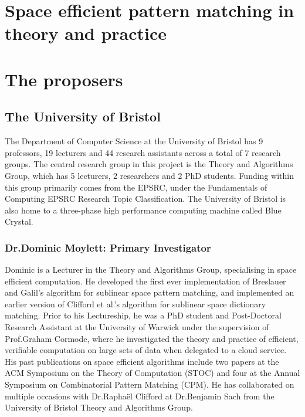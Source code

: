 \documentclass[a4paper,11pt]{article}
\begin{document}
    \section*{Space efficient pattern matching in theory and practice}

    \section*{The proposers}

    \subsection*{The University of Bristol}

    The Department of Computer Science at the University of Bristol has 9 professors, 19 lecturers and 44 research assistants across a total of 7 research groups. The central research group in this project is the Theory and Algorithms Group, which has 5 lecturers, 2 researchers and 2 PhD students. Funding within this group primarily comes from the EPSRC, under the Fundamentals of Computing EPSRC Research Topic Classification. The University of Bristol is also home to a three-phase high performance computing machine called Blue Crystal.

    \subsubsection*{Dr.\@ Dominic Moylett: Primary Investigator}

    Dominic is a Lecturer in the Theory and Algorithms Group, specialising in space efficient computation. He developed the first ever implementation of Breslauer and Galil's algorithm for sublinear space pattern matching, and implemented an earlier version of Clifford et al.'s algorithm for sublinear space dictionary matching. Prior to his Lectureship, he was a PhD student and Post-Doctoral Research Assistant at the University of Warwick under the supervision of Prof.\@ Graham Cormode, where he investigated the theory and practice of efficient, verifiable computation on large sets of data when delegated to a cloud service. His past publications on space efficient algorithms include two papers at the ACM Symposium on the Theory of Computation (STOC) and four at the Annual Symposium on Combinatorial Pattern Matching (CPM). He has collaborated on multiple occasions with Dr.\@ Rapha\"{e}l Clifford at Dr.\@ Benjamin Sach from the University of Bristol Theory and Algorithms Group.
\end{document}
